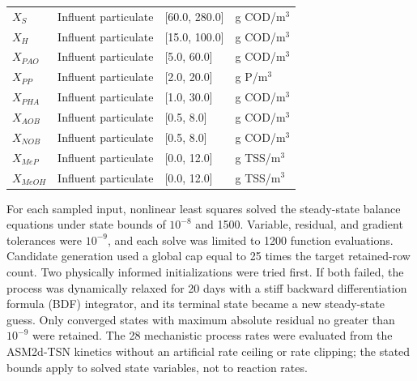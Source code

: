 \documentclass[a4paper,fleqn]{cas-sc}
\begin{document}
\begin{table}[htbp]
\begin{tabular}{p{2.1cm}p{2.7cm}p{2.8cm}p{3.0cm}}
$X_S$ & Influent particulate & [60.0, 280.0] & g COD/m$^3$ \\
$X_H$ & Influent particulate & [15.0, 100.0] & g COD/m$^3$ \\
$X_{PAO}$ & Influent particulate & [5.0, 60.0] & g COD/m$^3$ \\
$X_{PP}$ & Influent particulate & [2.0, 20.0] & g P/m$^3$ \\
$X_{PHA}$ & Influent particulate & [1.0, 30.0] & g COD/m$^3$ \\
$X_{AOB}$ & Influent particulate & [0.5, 8.0] & g COD/m$^3$ \\
$X_{NOB}$ & Influent particulate & [0.5, 8.0] & g COD/m$^3$ \\
$X_{MeP}$ & Influent particulate & [0.0, 12.0] & g TSS/m$^3$ \\
$X_{MeOH}$ & Influent particulate & [0.0, 12.0] & g TSS/m$^3$ \\
\hline
\end{tabular}
\end{table}

For each sampled input, nonlinear least squares solved the steady-state balance equations under state bounds of $10^{-8}$ and 1500. Variable, residual, and gradient tolerances were $10^{-9}$, and each solve was limited to 1200 function evaluations. Candidate generation used a global cap equal to 25 times the target retained-row count. Two physically informed initializations were tried first. If both failed, the process was dynamically relaxed for 20 days with a stiff backward differentiation formula (BDF) integrator, and its terminal state became a new steady-state guess. Only converged states with maximum absolute residual no greater than $10^{-9}$ were retained. The 28 mechanistic process rates were evaluated from the ASM2d-TSN kinetics without an artificial rate ceiling or rate clipping; the stated bounds apply to solved state variables, not to reaction rates.
\end{document}
